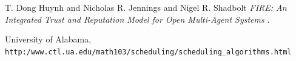 \documentclass[paper=a4, fontsize=11pt]{scrartcl} %
\numberwithin{equation}{section} %
\numberwithin{figure}{section} %
\numberwithin{table}{section} %
\begin{document}
\newpage
\begin{thebibliography}{9}
	T. Dong Huynh and Nicholas R. Jennings and Nigel R. Shadbolt
	\textit{FIRE: An Integrated Trust and Reputation Model for
		Open Multi-Agent Systems
}. 

	
	University of Alabama,
	\\\texttt{http:/www.ctl.ua.edu/{}math103/scheduling/scheduling\_algorithms.html}
\end{thebibliography}
\end{document}
